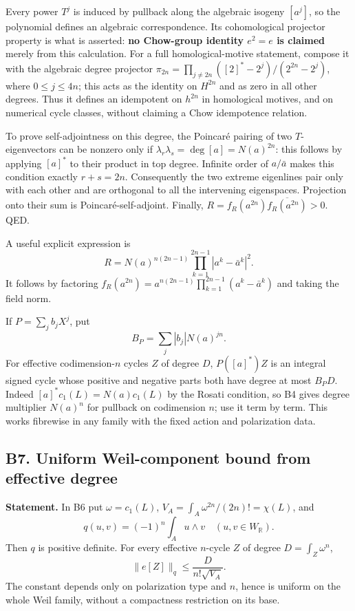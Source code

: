 Every power \(T^j\) is induced by pullback along the algebraic isogeny \([a^j]\), so the polynomial defines an algebraic correspondence. Its cohomological projector property is what is asserted: \textbf{no Chow-group identity \(e^2=e\) is claimed} merely from this calculation. For a full homological-motive statement, compose it with the algebraic degree projector \(\pi_{2n}=\prod_{j\ne2n}([2]^*-2^j)/(2^{2n}-2^j)\), where \(0\leq j\leq4n\); this acts as the identity on \(H^{2n}\) and as zero in all other degrees. Thus it defines an idempotent on \(h^{2n}\) in homological motives, and on numerical cycle classes, without claiming a Chow idempotence relation.

To prove self-adjointness on this degree, the Poincaré pairing of two \(T\)-eigenvectors can be nonzero only if \(\lambda_r\lambda_s=\deg[a]=N(a)^{2n}\): this follows by applying \([a]^*\) to their product in top degree. Infinite order of \(a/\bar a\) makes this condition exactly \(r+s=2n\). Consequently the two extreme eigenlines pair only with each other and are orthogonal to all the intervening eigenspaces. Projection onto their sum is Poincaré-self-adjoint. Finally, \(R=f_R(a^{2n})\overline{f_R(a^{2n})}>0\). QED.

A useful explicit expression is \[
 R=N(a)^{n(2n-1)}\prod_{k=1}^{2n-1}|a^k-\bar a^k|^2.
\] It follows by factoring \(f_R(a^{2n})=a^{n(2n-1)}\prod_{k=1}^{2n-1}(a^k-\bar a^k)\) and taking the field norm.

If \(P=\sum_jb_jX^j\), put \[
 B_P=\sum_j|b_j|N(a)^{jn}.
\] For effective codimension-\(n\) cycles \(Z\) of degree \(D\), \(P([a]^*)Z\) is an integral signed cycle whose positive and negative parts both have degree at most \(B_PD\). Indeed \([a]^*c_1(L)=N(a)c_1(L)\) by the Rosati condition, so B4 gives degree multiplier \(N(a)^n\) for pullback on codimension \(n\); use it term by term. This works fibrewise in any family with the fixed action and polarization data.

\subsection{B7. Uniform Weil-component bound from effective degree}\label{b7.-uniform-weil-component-bound-from-effective-degree}

\textbf{Statement.} In B6 put \(\omega=c_1(L)\), \(V_A=\int_A\omega^{2n}/(2n)!=\chi(L)\), and \[
 q(u,v)=(-1)^n\int_Au\wedge v\quad(u,v\in W_\mathbb R).
\] Then \(q\) is positive definite. For every effective \(n\)-cycle \(Z\) of degree \(D=\int_Z\omega^n\), \[
 \|e[Z]\|_q\leq\frac{D}{n!\sqrt{V_A}}.
\] The constant depends only on polarization type and \(n\), hence is uniform on the whole Weil family, without a compactness restriction on its base.

